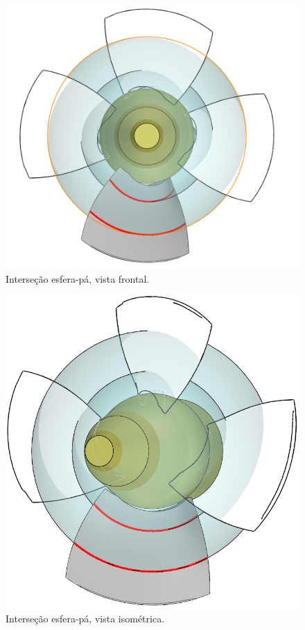 \begin{figure}[t!]
	\centering
	\includegraphics[width=\columnwidth]{figs/planejamento/intersecao_frontal.PNG}
	\caption{Interseção esfera-pá, vista frontal.}
	\label{fig::interfrontal}
\end{figure}

\begin{figure}[t!]
	\centering
	\includegraphics[width=\columnwidth]{figs/planejamento/intersecao_iso.PNG}
	\caption{Interseção esfera-pá, vista isométrica.}
	\label{fig::interiso}
\end{figure}

